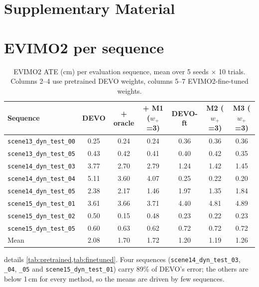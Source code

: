 \documentclass[conference]{IEEEtran}
\newcommand{\code}[1]{\texttt{#1}}
\newcommand{\wplus}{w_{+}}
\begin{document}



\clearpage
\onecolumn
\section*{Supplementary Material}
\setcounter{section}{0}
\renewcommand{\thesection}{\Alph{section}}
\renewcommand{\thesectiondis}{\Alph{section}.}

\section{EVIMO2 per sequence}

\begin{table}[H]
\centering
\caption{EVIMO2 ATE (cm) per evaluation sequence, mean over 5 seeds $\times$ 10 trials.
Columns 2--4 use pretrained DEVO weights, columns 5--7 EVIMO2-fine-tuned weights.}
\label{tab:perscene}
\begin{tabular}{lcccccc}
\toprule
Sequence & DEVO & + oracle & + M1 ($\wplus$=3) & DEVO-ft & M2 ($\wplus$=3) & M3 ($\wplus$=3) \\
\midrule
\code{scene13\_dyn\_test\_00} & 0.25 & 0.24 & 0.24 & 0.36 & 0.36 & 0.36 \\
\code{scene13\_dyn\_test\_05} & 0.43 & 0.42 & 0.41 & 0.40 & 0.42 & 0.35 \\
\code{scene14\_dyn\_test\_03} & 3.77 & 2.70 & 2.79 & 1.24 & 1.42 & 1.45 \\
\code{scene14\_dyn\_test\_04} & 5.11 & 3.60 & 4.07 & 0.25 & 0.22 & 0.20 \\
\code{scene14\_dyn\_test\_05} & 2.38 & 2.17 & 1.46 & 1.97 & 1.35 & 1.84 \\
\code{scene15\_dyn\_test\_01} & 3.61 & 3.66 & 3.71 & 4.40 & 4.81 & 4.89 \\
\code{scene15\_dyn\_test\_02} & 0.50 & 0.15 & 0.48 & 0.23 & 0.22 & 0.23 \\
\code{scene15\_dyn\_test\_05} & 0.60 & 0.63 & 0.62 & 0.72 & 0.72 & 0.72 \\
\midrule
Mean & 2.08 & 1.70 & 1.72 & 1.20 & 1.19 & 1.26 \\
\bottomrule
\end{tabular}
\end{table}

 details \cref{tab:pretrained,tab:finetuned}. Four sequences
(\code{scene14\_dyn\_test\_03}, \code{\_04}, \code{\_05} and \code{scene15\_dyn\_test\_01})
carry 89\% of DEVO's error; the others are below 1\,cm for every method, so the means are
driven by few sequences.
\end{document}

